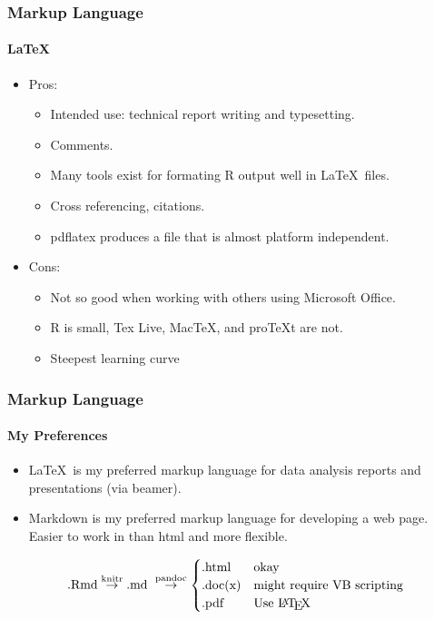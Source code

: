 \documentclass[t]{beamer}\usepackage[]{graphicx}\usepackage[]{color}
\begin{document}
\begin{frame}
  \frametitle{Markup Language}
  \framesubtitle{\LaTeX}
  \begin{itemize}
    \item Pros: 
      \begin{itemize}
        \item Intended use: technical report writing and typesetting.
        \item Comments.
        \item Many tools exist for formating R output well in \LaTeX\ files.
        \item Cross referencing, citations.
        \item pdflatex produces a file that is almost platform independent.
      \end{itemize}

    \item Cons:
      \begin{itemize}
        \item Not so good when working with others using Microsoft Office.
        \item R is small,  Tex Live, MacTeX, and proTeXt are not.
        \item Steepest learning curve
      \end{itemize}
  \end{itemize} 
\end{frame}

\begin{frame}
  \frametitle{Markup Language}
  \framesubtitle{My Preferences}
  \begin{itemize}
    \item \LaTeX\ is my preferred markup language for data analysis reports and
      presentations (via beamer).

    \item Markdown is my preferred markup language for developing a web page.
      Easier to work in than html and more flexible.

  \end{itemize} 

  \[ 
  \text{.Rmd} \stackrel{\text{knitr}}{\rightarrow} 
  \text{.md } \stackrel{\text{pandoc}}{\rightarrow} 
  \begin{cases} 
        \text{.html} & \text{okay} \\
        \text{.doc(x)} & \text{might require VB scripting} \\
        \text{.pdf}  & \text{Use \LaTeX} 
      \end{cases}\]

\end{frame}
\end{document}
